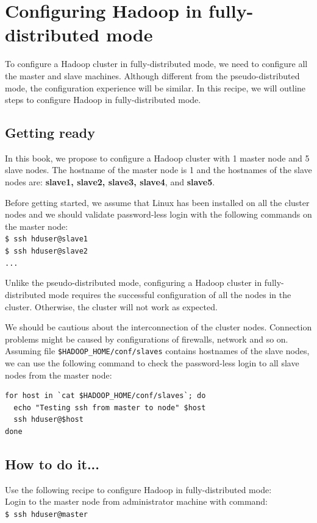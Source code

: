 \section{Configuring Hadoop in fully-distributed mode}
To configure a Hadoop cluster in fully-distributed mode, we need to configure all the master and slave machines. Although different from the pseudo-distributed mode, the configuration experience will be similar.  In this recipe, we will outline steps to configure Hadoop in fully-distributed mode.
\subsection*{Getting ready}
In this book, we propose to configure a Hadoop cluster with 1 master node and 5 slave nodes. The hostname of the master node is 1 and the hostnames of the slave nodes are: \textbf{slave1, slave2, slave3, slave4}, and \textbf{slave5}.

Before getting started, we assume that Linux has been installed on all the cluster nodes and we should validate password-less login with the following commands on the master node: \\
\verb|$ ssh hduser@slave1| \\
\verb|$ ssh hduser@slave2| \\
\verb|...|

Unlike the pseudo-distributed mode, configuring a Hadoop cluster in fully-distributed mode requires the successful configuration of all the nodes in the cluster. Otherwise, the cluster will not work as expected.

We should be cautious about the interconnection of the cluster nodes. Connection problems might be caused by configurations of firewalls, network and so on.
Assuming file \verb|$HADOOP_HOME/conf/slaves| contains hostnames of the slave nodes, we can use the following command to check the password-less login to all slave nodes from the master node: 
\begin{verbatim}
for host in `cat $HADOOP_HOME/conf/slaves`; do
  echo "Testing ssh from master to node" $host
  ssh hduser@$host
done
\end{verbatim}

\subsection*{How to do it...}
Use the following recipe to configure Hadoop in fully-distributed mode: \\
Login to the master node from administrator machine with command: \\
\verb|$ ssh hduser@master|

